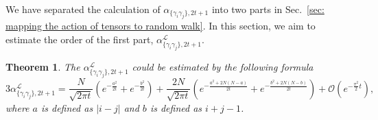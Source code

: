 \documentclass{article}
\newtheorem{theorem}{Theorem}
\newcommand{\alpl}{\alpha_{\{\gamma_i\gamma_j\}, 2t+1}^{\mathscr{L}}}
\begin{document}
We have separated the calculation of $\alpha_{\{\gamma_i\gamma_j\},2t+1}$ into two parts in Sec.~\ref{sec: mapping the action of tensors to random walk}. In this section, we aim to estimate the order of the first part, $\alpl$.
\begin{theorem}
\label{theorem: order of alpha l}
    The $\alpl$ could be estimated by the following formula
    \begin{equation}
        3\alpl = \frac{N}{\sqrt{2\pi t}} (e^{-\frac{a^2}{2t}}+ e^{-\frac{b^2}{2t}}) + \frac{2N}{\sqrt{2\pi t}}(e^{-\frac{a^2+2N(N-a)}{2t}}+ e^{-\frac{b^2+2N(N-b)}{2t}}) + \mathcal{O}\left(e^{-\frac{\pi^2}{2}t}\right),
    \end{equation}
    where $a$ is defined as $|i-j|$ and $b$ is defined as $i+j-1$.
\end{theorem}
\end{document}
